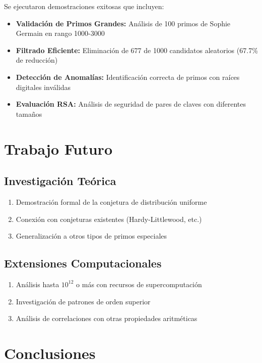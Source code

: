 \documentclass[11pt,a4paper]{article}
\theoremstyle{definition}
\theoremstyle{remark}
\begin{document}
Se ejecutaron demostraciones exitosas que incluyen:

\begin{itemize}
    \item \textbf{Validación de Primos Grandes:} Análisis de 100 primos de Sophie Germain en rango 1000-3000
    \item \textbf{Filtrado Eficiente:} Eliminación de 677 de 1000 candidatos aleatorios (67.7\% de reducción)
    \item \textbf{Detección de Anomalías:} Identificación correcta de primos con raíces digitales inválidas
    \item \textbf{Evaluación RSA:} Análisis de seguridad de pares de claves con diferentes tamaños
\end{itemize}

\section{Trabajo Futuro}

\subsection{Investigación Teórica}

\begin{enumerate}
    \item Demostración formal de la conjetura de distribución uniforme
    \item Conexión con conjeturas existentes (Hardy-Littlewood, etc.)
    \item Generalización a otros tipos de primos especiales
\end{enumerate}

\subsection{Extensiones Computacionales}

\begin{enumerate}
    \item Análisis hasta $10^{12}$ o más con recursos de supercomputación
    \item Investigación de patrones de orden superior
    \item Análisis de correlaciones con otras propiedades aritméticas
\end{enumerate}

\section{Conclusiones}
\end{document}

